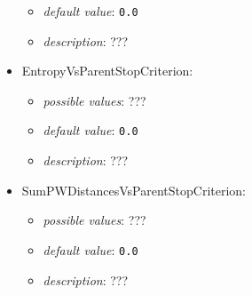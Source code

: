 \documentclass{article}
\begin{document}
\begin{itemize}
\begin{itemize}
                \item \emph{default value}: \texttt{0.0}
                \item \emph{description}: ???
           \end{itemize}
    \item EntropyVsParentStopCriterion:
           \begin{itemize}
                \item \emph{possible values}: ???
                \item \emph{default value}: \texttt{0.0}
                \item \emph{description}: ???
           \end{itemize}
    \item SumPWDistancesVsParentStopCriterion:
           \begin{itemize}
                \item \emph{possible values}: ???
                \item \emph{default value}: \texttt{0.0}
                \item \emph{description}: ???
           \end{itemize}
\end{itemize}
\end{document}
